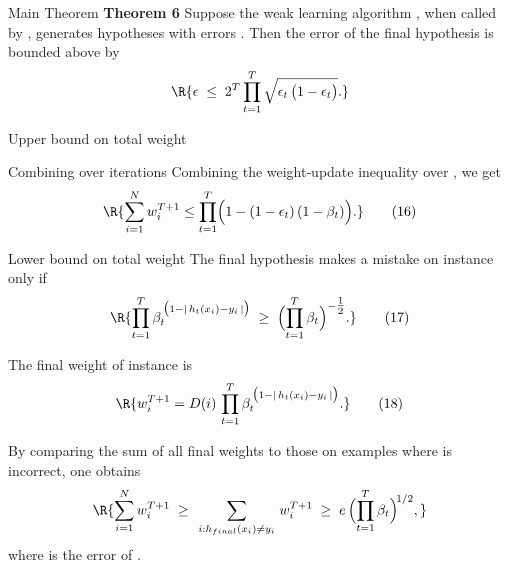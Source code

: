 \documentclass{beamer}
\begin{document}
\begin{frame}{Main Theorem}
  \textbf{Theorem 6} 
  Suppose the weak learning algorithm , 
  when called by , 
  generates hypotheses with errors . 
  Then the error 
  of the final hypothesis  is bounded above by
  \[
    \R{\epsilon \;\le\; 2^T \prod_{t=1}^T \sqrt{\epsilon_t \,\bigl(1 - \epsilon_t\bigr)}.}
  \]
\end{frame}

\begin{frame}{Upper bound on total weight}
  
\end{frame}

\begin{frame}{Combining over iterations}
Combining the weight‐update inequality over , we get 
\[
  \R{\sum_{i=1}^N w_i^{T+1} 
       \le \prod_{t=1}^T 
         \Bigl(1 - (1-\epsilon_t)\,(1-\beta_t)\Bigr).}
  \tag{16}
\]
\end{frame}

\begin{frame}{Lower bound on total weight}
The final hypothesis  makes a mistake on instance  only if
\[
  \R{
    \prod_{t=1}^T \beta_t^{\,\bigl(1-|\,h_t(x_i)-y_i\,|\bigr)}
    \;\ge\;
    \Bigl(\prod_{t=1}^T \beta_t\Bigr)^{-\tfrac12}.
  }
  \tag{17}
\]

The final weight of instance  is
\[
  \R{w_i^{T+1} = D(i)\,\prod_{t=1}^T \beta_t^{\,\bigl(1-|\,h_t(x_i)-y_i\,|\bigr)}.}
  \tag{18}
\]

By comparing the sum of all final weights to those on examples where  is incorrect, one obtains
\[
  \R{\sum_{i=1}^N w_i^{T+1}
       \;\ge\;
       \sum_{\,i : h_{final}(x_i)\neq y_i\,} w_i^{T+1}
       \;\ge\;
       e \,\Bigl(\prod_{t=1}^T \beta_t\Bigr)^{\!1/2},}
\]
where  is the error of . 
\end{frame}
\end{document}
